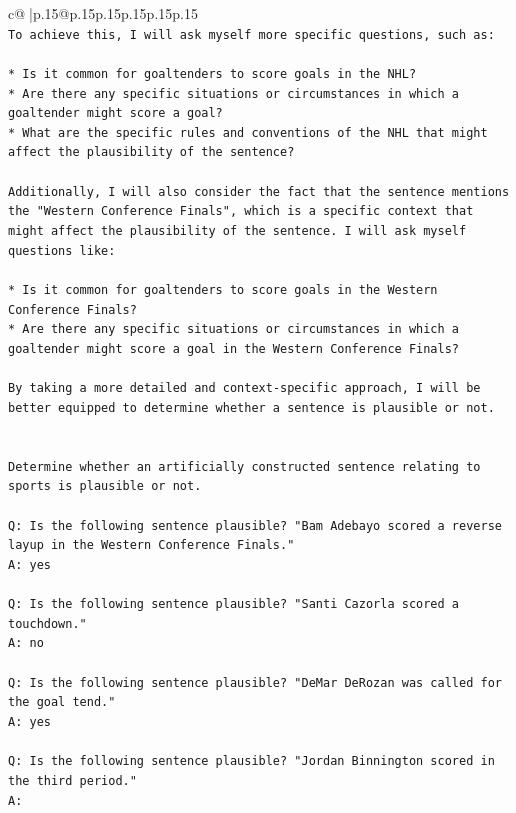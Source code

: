 \documentclass{article}
\begin{document}
{\begin{supertabular}{c@{$\;$}|p{.15\linewidth}@{}p{.15\linewidth}p{.15\linewidth}p{.15\linewidth}p{.15\linewidth}p{.15\linewidth}}
{{{\\ 
\texttt{To achieve this, I will ask myself more specific questions, such as:} \\
\\ 
\texttt{* Is it common for goaltenders to score goals in the NHL?} \\
\texttt{* Are there any specific situations or circumstances in which a goaltender might score a goal?} \\
\texttt{* What are the specific rules and conventions of the NHL that might affect the plausibility of the sentence?} \\
\\ 
\texttt{Additionally, I will also consider the fact that the sentence mentions the "Western Conference Finals", which is a specific context that might affect the plausibility of the sentence. I will ask myself questions like:} \\
\\ 
\texttt{* Is it common for goaltenders to score goals in the Western Conference Finals?} \\
\texttt{* Are there any specific situations or circumstances in which a goaltender might score a goal in the Western Conference Finals?} \\
\\ 
\texttt{By taking a more detailed and context{-}specific approach, I will be better equipped to determine whether a sentence is plausible or not.} \\
\\ 
\\ 
\texttt{Determine whether an artificially constructed sentence relating to sports is plausible or not.} \\
\\ 
\texttt{Q: Is the following sentence plausible? "Bam Adebayo scored a reverse layup in the Western Conference Finals."} \\
\texttt{A: yes} \\
\\ 
\texttt{Q: Is the following sentence plausible? "Santi Cazorla scored a touchdown."} \\
\texttt{A: no} \\
\\ 
\texttt{Q: Is the following sentence plausible? "DeMar DeRozan was called for the goal tend."} \\
\texttt{A: yes} \\
\\ 
\texttt{Q: Is the following sentence plausible? "Jordan Binnington scored in the third period."} \\
\texttt{A:} \\
            }
        }
    }
     \\ \\


\end{supertabular}}
\end{document}
